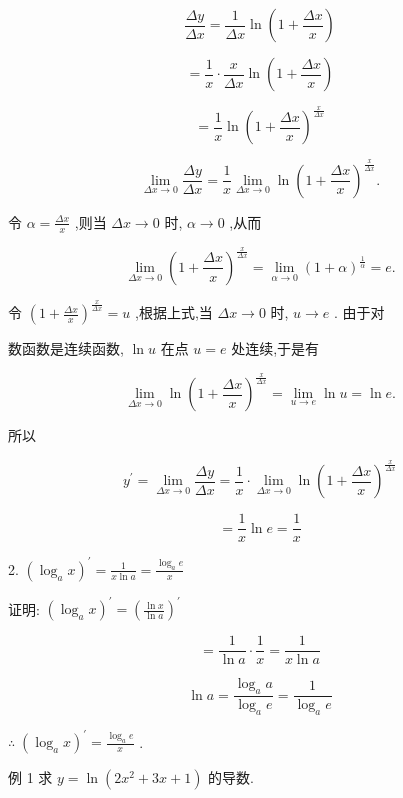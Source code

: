 \documentclass[10pt]{article}
\begin{document}
\[
\frac{\Delta y}{\Delta x} = \frac{1}{\Delta x}\ln \left( {1 + \frac{\Delta x}{x}}\right)
\]

\[
= \frac{1}{x} \cdot \frac{x}{\Delta x}\ln \left( {1 + \frac{\Delta x}{x}}\right)
\]

\[
= \frac{1}{x}\ln {\left( 1 + \frac{\Delta x}{x}\right) }^{\frac{x}{\Delta x}}
\]

\[
\mathop{\lim }\limits_{{{\Delta x} \rightarrow 0}}\frac{\Delta y}{\Delta x} = \frac{1}{x}\mathop{\lim }\limits_{{{\Delta x} \rightarrow 0}}\ln {\left( 1 + \frac{\Delta x}{x}\right) }^{\frac{x}{\Delta x}}.
\]

令 \(\alpha = \frac{\Delta x}{x}\) ,则当 \({\Delta x} \rightarrow 0\) 时, \(\alpha \rightarrow 0\) ,从而

\[
\mathop{\lim }\limits_{{{\Delta x} \rightarrow 0}}{\left( 1 + \frac{\Delta x}{x}\right) }^{\frac{x}{\Delta x}} = \mathop{\lim }\limits_{{\alpha \rightarrow 0}}{\left( 1 + \alpha \right) }^{\frac{1}{\alpha }} = e.
\]

令 \({\left( 1 + \frac{\Delta x}{x}\right) }^{\frac{x}{\Delta x}} = u\) ,根据上式,当 \({\Delta x} \rightarrow 0\) 时, \(u \rightarrow e\) . 由于对

数函数是连续函数, \(\ln u\) 在点 \(u = e\) 处连续,于是有

\[
\mathop{\lim }\limits_{{{\Delta x} \rightarrow 0}}\ln {\left( 1 + \frac{\Delta x}{x}\right) }^{\frac{x}{\Delta x}} = \mathop{\lim }\limits_{{u \rightarrow e}}\ln u = \ln e.
\]

所以

\[
{y}^{\prime } = \mathop{\lim }\limits_{{{\Delta x} \rightarrow 0}}\frac{\Delta y}{\Delta x} = \frac{1}{x} \cdot \mathop{\lim }\limits_{{{\Delta x} \rightarrow 0}}\ln {\left( 1 + \frac{\Delta x}{x}\right) }^{\frac{x}{\Delta x}}
\]

\[
= \frac{1}{x}\ln e = \frac{1}{x}
\]

2. \({\left( {\log }_{a}x\right) }^{\prime } = \frac{1}{x\ln a} = \frac{{\log }_{a}e}{x}\)

证明: \({\left( {\log }_{a}x\right) }^{\prime } = {\left( \frac{\ln x}{\ln a}\right) }^{\prime }\)

\[
= \frac{1}{\ln a} \cdot \frac{1}{x} = \frac{1}{x\ln a}
\]

\[
\ln a = \frac{{\log }_{a}a}{{\log }_{a}e} = \frac{1}{{\log }_{a}e}
\]

\(\therefore \;{\left( {\log }_{a}x\right) }^{\prime } = \frac{{\log }_{a}e}{x}\) .

例 1 求 \(y = \ln \left( {2{x}^{2} + {3x} + 1}\right)\) 的导数.
\end{document}
